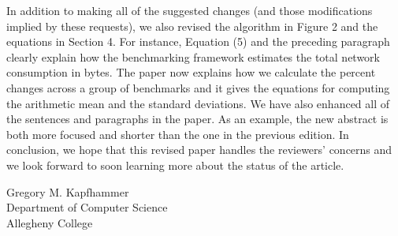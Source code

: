 \documentclass[11pt]{article}
\begin{document}
\vspace*{-.15in}

In addition to making all of the suggested changes (and those
modifications implied by these requests), we also revised the
algorithm in Figure 2 and the equations in Section 4.  For instance,
Equation (5) and the preceding paragraph clearly explain how the
benchmarking framework estimates the total network consumption in
bytes.  The paper now explains how we calculate the percent changes
across a group of benchmarks and it gives the equations for computing
the arithmetic mean and the standard deviations.  We have also
enhanced all of the sentences and paragraphs in the paper.  As an
example, the new abstract is both more focused and shorter than the
one in the previous edition.  In conclusion, we hope that this
revised paper handles the reviewers' concerns and we look forward to
soon learning more about the status of the article.

\vspace*{.15in}
\noindent
Gregory M. Kapfhammer \\
Department of Computer Science \\
Allegheny  College
\end{document}
